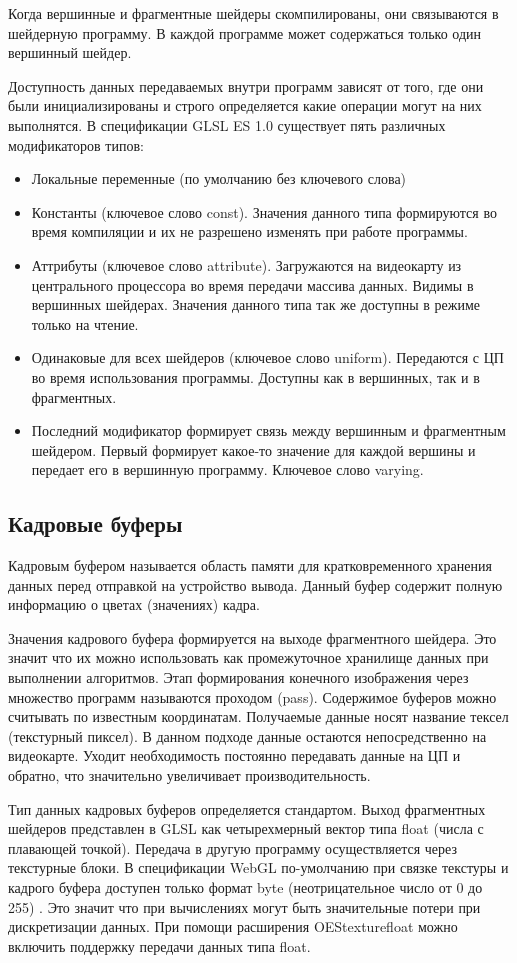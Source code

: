 Когда вершинные и фрагментные шейдеры скомпилированы, они связываются в шейдерную программу.
В каждой программе может содержаться только один вершинный шейдер.

Доступность данных передаваемых внутри программ зависят от того, где они были инициализированы
и строго определяется какие операции могут на них выполнятся. В спецификации GLSL ES 1.0 
существует пять различных модификаторов типов:

\begin{itemize}
  \item Локальные переменные (по умолчанию без ключевого слова)
  \item Константы (ключевое слово const). Значения данного типа формируются во время компиляции и их не
    разрешено изменять при работе программы.
  \item Аттрибуты (ключевое слово attribute). Загружаются на видеокарту из центрального процессора во время передачи массива данных. Видимы в 
    вершинных шейдерах. Значения данного типа так же доступны в режиме только на чтение.
  \item Одинаковые для всех шейдеров (ключевое слово uniform). Передаются с ЦП во время 
    использования программы. Доступны как в вершинных, так и в фрагментных.
  \item Последний модификатор формирует связь между вершинным и фрагментным шейдером. Первый
    формирует какое-то значение для каждой вершины и передает его в вершинную программу.
    Ключевое слово varying.
\end{itemize}

\subsection{Кадровые буферы}

Кадровым буфером называется область памяти для кратковременного хранения данных перед отправкой
на устройство вывода. Данный буфер содержит полную информацию о цветах (значениях) кадра.

Значения кадрового буфера формируется на выходе фрагментного шейдера. Это значит что их можно 
использовать как промежуточное хранилище данных при выполнении алгоритмов. Этап формирования 
конечного изображения через множество программ называются проходом (pass). Содержимое буферов 
можно считывать по известным координатам. Получаемые данные носят название тексел (текстурный 
пиксел). В данном подходе данные остаются непосредственно на видеокарте. Уходит необходимость
постоянно передавать данные на ЦП и обратно, что значительно увеличивает производительность.

Тип данных кадровых буферов определяется стандартом. Выход фрагментных шейдеров представлен в 
GLSL как четырехмерный вектор типа float (числа с плавающей точкой). Передача в другую программу
осуществляется через текстурные блоки. В спецификации WebGL по-умолчанию при связке текстуры
и кадрого буфера доступен только формат byte (неотрицательное число от 0 до 255) \cite{khr11}. 
Это значит что при вычислениях могут быть значительные потери при дискретизации данных. При помощи
расширения OES\textunderscore{}texture\textunderscore{}float можно включить поддержку передачи 
данных типа float.
